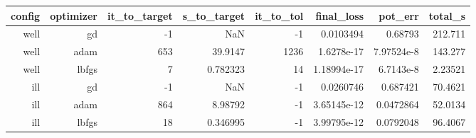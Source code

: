 \begin{tabular}{rrrrrrrr}
  \toprule
  \textbf{config} & \textbf{optimizer} & \textbf{it\_to\_target} & \textbf{s\_to\_target} & \textbf{it\_to\_tol} & \textbf{final\_loss} & \textbf{pot\_err} & \textbf{total\_s} \\
  \midrule
  well & gd & -1 & NaN & -1 & 0.0103494 & 0.68793 & 212.711 \\
  well & adam & 653 & 39.9147 & 1236 & 1.6278e-17 & 7.97524e-8 & 143.277 \\
  well & lbfgs & 7 & 0.782323 & 14 & 1.18994e-17 & 6.7143e-8 & 2.23521 \\
  ill & gd & -1 & NaN & -1 & 0.0260746 & 0.687421 & 70.4621 \\
  ill & adam & 864 & 8.98792 & -1 & 3.65145e-12 & 0.0472864 & 52.0134 \\
  ill & lbfgs & 18 & 0.346995 & -1 & 3.99795e-12 & 0.0792048 & 96.4067 \\
  \bottomrule
\end{tabular}
